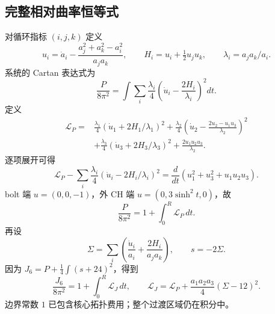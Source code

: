 \documentclass[UTF8,11pt,a4paper,fontset=none]{ctexart}
\numberwithin{equation}{section}
\theoremstyle{definition}
\theoremstyle{remark}\newtheorem{remark}[theorem]{说明}
\begin{document}
\subsection{完整相对曲率恒等式}
对循环指标 $(i,j,k)$ 定义
\[
u_i=\dot a_i-\frac{a_j^2+a_k^2-a_i^2}{a_ja_k},\qquad
H_i=u_i+\tfrac12u_ju_k,\qquad \lambda_i=a_ja_k/a_i.
\]
系统的 Cartan 表达式\cite{CellSource}为
\begin{equation}\label{eq:Pdensity}
\frac{P}{8\pi^2}=\int\sum_i\frac{\lambda_i}{4}
\left(\dot u_i-\frac{2H_i}{\lambda_i}\right)^2dt.
\end{equation}
定义
\begin{equation}\label{eq:relative-density}
\begin{split}
\mathscr L_P={}&\frac{\lambda_1}{4}(\dot u_1+2H_1/\lambda_1)^2
+\frac{\lambda_2}{4}\left(\dot u_2-\frac{2u_2-u_1u_3}{\lambda_2}\right)^2\\
&+\frac{\lambda_3}{4}(\dot u_3+2H_3/\lambda_3)^2
+\frac{2u_1u_2u_3}{\lambda_2}.
\end{split}
\end{equation}
逐项展开可得
\[
\mathscr L_P-\sum_i\frac{\lambda_i}{4}(\dot u_i-2H_i/\lambda_i)^2
=\frac d{dt}(u_1^2+u_3^2+u_1u_2u_3).
\]
bolt 端 $u=(0,0,-1)$，外 CH 端 $u=(0,3\sinh^2t,0)$，故
\begin{equation}\label{eq:Pcalibration}
\frac P{8\pi^2}=1+\int_0^R\mathscr L_P\,dt.
\end{equation}
再设
\[
\Sigma=\sum_i\left(\frac{\dot u_i}{a_i}+\frac{2H_i}{a_ja_k}\right),\qquad s=-2\Sigma.
\]
因为 $J_6=P+\tfrac14\int(s+24)^2$，得到
\begin{equation}\label{eq:Jcalibration}
\frac{J_6}{8\pi^2}=1+\int_0^R\mathscr L_J\,dt,
\qquad \mathscr L_J=\mathscr L_P+\frac{a_1a_2a_3}{4}(\Sigma-12)^2.
\end{equation}
边界常数 $1$ 已包含核心拓扑费用；整个过渡区域仍在积分中。
\end{document}
